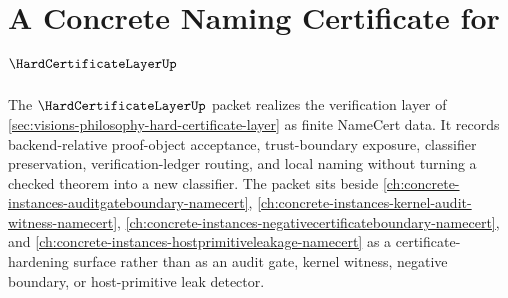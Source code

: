 \chapter{A Concrete Naming Certificate for $\HardCertificateLayerUp$}
\label{ch:concrete-instances-hard-certificate-layer-namecert}

The $\HardCertificateLayerUp$ packet realizes the verification layer of \autoref{sec:visions-philosophy-hard-certificate-layer} as finite NameCert data. It records backend-relative proof-object acceptance, trust-boundary exposure, classifier preservation, verification-ledger routing, and local naming without turning a checked theorem into a new classifier. The packet sits beside \autoref{ch:concrete-instances-auditgateboundary-namecert}, \autoref{ch:concrete-instances-kernel-audit-witness-namecert}, \autoref{ch:concrete-instances-negativecertificateboundary-namecert}, and \autoref{ch:concrete-instances-hostprimitiveleakage-namecert} as a certificate-hardening surface rather than as an audit gate, kernel witness, negative boundary, or host-primitive leak detector.

